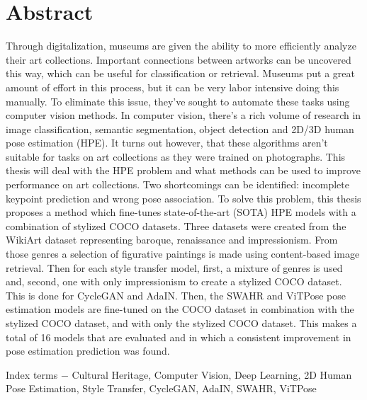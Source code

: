 \chapter*{Abstract}

Through digitalization, museums are given the ability to more efficiently analyze their art collections.
Important connections between artworks can be uncovered this way, which can be useful for classification or retrieval.
Museums put a great amount of effort in this process, but it can be very labor intensive doing this manually.
To eliminate this issue, they've sought to automate these tasks using computer vision methods.
In computer vision, there's a rich volume of research in image classification, semantic segmentation, object detection and 2D/3D human pose estimation (HPE).
It turns out however, that these algorithms aren't suitable for tasks on art collections as they were trained on photographs.
This thesis will deal with the HPE problem and what methods can be used to improve performance on art collections.
Two shortcomings can be identified: incomplete keypoint prediction and wrong pose association.
To solve this problem, this thesis proposes a method which fine-tunes state-of-the-art (SOTA) HPE models with a combination of stylized COCO datasets.
Three datasets were created from the WikiArt dataset representing baroque, renaissance and impressionism.
From those genres a selection of figurative paintings is made using content-based image retrieval.
Then for each style transfer model, first, a mixture of genres is used and, second, one with only impressionism to create a stylized COCO dataset.
This is done for CycleGAN and AdaIN.
Then, the SWAHR and ViTPose pose estimation models are fine-tuned on the COCO dataset in combination with the stylized COCO dataset, and with only the stylized COCO dataset.
This makes a total of 16 models that are evaluated and in which a consistent improvement in pose estimation prediction was found.

Index terms $-$ Cultural Heritage, Computer Vision, Deep Learning, 2D Human Pose Estimation, Style Transfer, CycleGAN, AdaIN, SWAHR, ViTPose